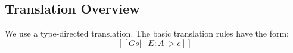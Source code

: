 
\subsection{Translation Overview}

We use a type-directed translation. The basic translation rules have the form:
\[
[[Gs  |- E : A ~> e]]
\]

